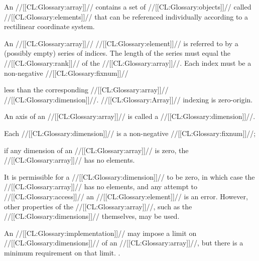 

 

An //[[CL:Glossary:array]]// contains a set of //[[CL:Glossary:objects]]// called //[[CL:Glossary:elements]]// that can be referenced individually according to a rectilinear coordinate system.


An //[[CL:Glossary:array]]// //[[CL:Glossary:element]]// is referred to by a (possibly empty) series of indices. The length of the series must equal the //[[CL:Glossary:rank]]// of the //[[CL:Glossary:array]]//.  Each index must be a non-negative //[[CL:Glossary:fixnum]]// 

less than the corresponding //[[CL:Glossary:array]]// //[[CL:Glossary:dimension]]//. //[[CL:Glossary:Array]]// indexing is zero-origin.

\endsubsubsection%


An axis of an //[[CL:Glossary:array]]// is called a //[[CL:Glossary:dimension]]//.

Each //[[CL:Glossary:dimension]]// is a non-negative   //[[CL:Glossary:fixnum]]//;

 if any dimension of an //[[CL:Glossary:array]]// is zero, the //[[CL:Glossary:array]]// has no elements.

It is permissible for a //[[CL:Glossary:dimension]]// to be zero,  in which case the //[[CL:Glossary:array]]// has no elements,  and any attempt to //[[CL:Glossary:access]]// an //[[CL:Glossary:element]]// is an error.  However, other properties of the //[[CL:Glossary:array]]//,   such as the //[[CL:Glossary:dimensions]]// themselves, may be used.


An //[[CL:Glossary:implementation]]// may impose a limit on //[[CL:Glossary:dimensions]]// of an //[[CL:Glossary:array]]//, but there is a minimum requirement on that limit.  .

\endsubsubsubsection%

\endsubsubsection%


